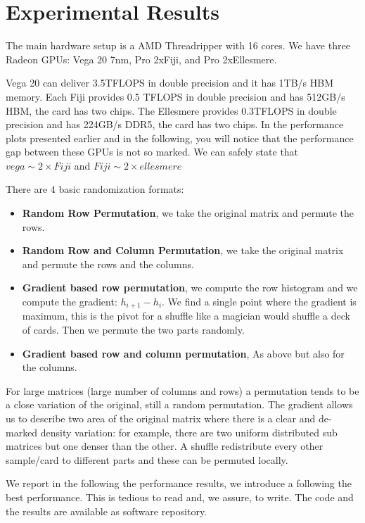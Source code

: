 \documentclass[manuscript,screen]{acmart}
\begin{document}
\section{Experimental Results}
\label{sec:experimentalresults}
The main hardware setup is a AMD Threadripper with 16 cores. We have
three Radeon GPUs: Vega 20 7nm, Pro 2xFiji, and Pro 2xEllesmere.

Vega 20 can deliver 3.5TFLOPS in double precision and it has 1TB/s HBM
memory. Each Fiji provides 0.5 TFLOPS in double precision and has
512GB/s HBM, the card has two chips.  The Ellesmere provides 0.3TFLOPS
in double precision and has 224GB/s DDR5, the card has two chips. In
the performance plots presented earlier and in the following, you will
notice that the performance gap between these GPUs is not so
marked. We can safely state that $vega \sim 2\times Fiji$ and $Fiji \sim
2\times ellesmere$



There are 4 basic randomization formats:
\begin{itemize}
  \item {\bf Random Row Permutation}, we take the original matrix and
    permute the rows.
  \item {\bf Random Row and Column Permutation}, we take the original
    matrix and permute the rows and the columns.
  \item {\bf Gradient based row permutation}, we compute the row
    histogram and we compute the gradient: $h_{i+1} - h_i$. We find a
    single point where the gradient is maximum, this is the pivot for
    a shuffle like a magician would shuffle a deck of cards.  Then we
    permute the two parts randomly.
  \item {\bf Gradient based row and column permutation}, As above but
    also for the columns.
\end{itemize}

For large matrices (large number of columns and rows) a permutation
tends to be a close variation of the original, still a random
permutation. The gradient allows us to describe two area of the
original matrix where there is a clear and de-marked density
variation: for example, there are two uniform distributed sub matrices
but one denser than the other. A shuffle redistribute every other
sample/card to different parts and these can be permuted locally.


    
We report in the following the performance results, we introduce a
{\bf *} following the best performance. This is tedious to read and,
we assure, to write. The code and the results are available as
software repository.  




%

 

%
\end{document}
